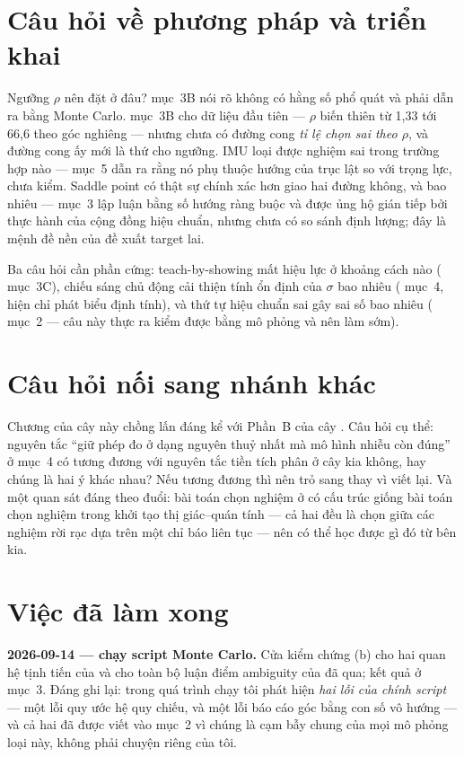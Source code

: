 \documentclass[marker.tex]{subfiles}
\begin{document}
\section*{Câu hỏi về phương pháp và triển khai}

Ngưỡng \(\rho\) nên đặt ở đâu?  mục~3B nói rõ không có hằng số phổ quát và phải dẫn ra bằng Monte Carlo.  mục~3B cho dữ liệu đầu tiên --- \(\rho\) biến thiên từ 1,33 tới 66,6 theo góc nghiêng --- nhưng chưa có đường cong \emph{tỉ lệ chọn sai theo \(\rho\)}, và đường cong ấy mới là thứ cho ngưỡng. IMU loại được nghiệm sai trong trường hợp nào ---  mục~5 dẫn ra rằng nó phụ thuộc hướng của trục lật so với trọng lực, chưa kiểm. Saddle point có thật sự chính xác hơn giao hai đường không, và bao nhiêu ---  mục~3 lập luận bằng số hướng ràng buộc và được ủng hộ gián tiếp bởi thực hành của cộng đồng hiệu chuẩn, nhưng chưa có so sánh định lượng; đây là mệnh đề nền của đề xuất target lai.

Ba câu hỏi cần phần cứng: teach-by-showing mất hiệu lực ở khoảng cách nào ( mục~3C), chiếu sáng chủ động cải thiện tính ổn định của \(\sigma\) bao nhiêu ( mục~4, hiện chỉ phát biểu định tính), và thứ tự hiệu chuẩn sai gây sai số bao nhiêu ( mục~2 --- câu này thực ra kiểm được bằng mô phỏng và nên làm sớm).

\section*{Câu hỏi nối sang nhánh khác}

Chương  của cây này chồng lấn đáng kể với Phần~B của cây . Câu hỏi cụ thể: nguyên tắc ``giữ phép đo ở dạng nguyên thuỷ nhất mà mô hình nhiễu còn đúng'' ở  mục~4 có tương đương với nguyên tắc tiền tích phân ở cây kia không, hay chúng là hai ý khác nhau? Nếu tương đương thì nên trỏ sang thay vì viết lại. Và một quan sát đáng theo đuổi: bài toán chọn nghiệm ở  có cấu trúc giống bài toán chọn nghiệm trong khởi tạo thị giác--quán tính --- cả hai đều là chọn giữa các nghiệm rời rạc dựa trên một chỉ báo liên tục --- nên có thể học được gì đó từ bên kia.

\section*{Việc đã làm xong}

\textbf{2026-09-14 --- chạy script Monte Carlo.} Cửa kiểm chứng (b) cho hai quan hệ tịnh tiến của  và cho toàn bộ luận điểm ambiguity của  đã qua; kết quả ở  mục~3. Đáng ghi lại: trong quá trình chạy tôi phát hiện \emph{hai lỗi của chính script} --- một lỗi quy ước hệ quy chiếu, và một lỗi báo cáo góc bằng con số vô hướng --- và cả hai đã được viết vào  mục~2 vì chúng là cạm bẫy chung của mọi mô phỏng loại này, không phải chuyện riêng của tôi.
\end{document}
